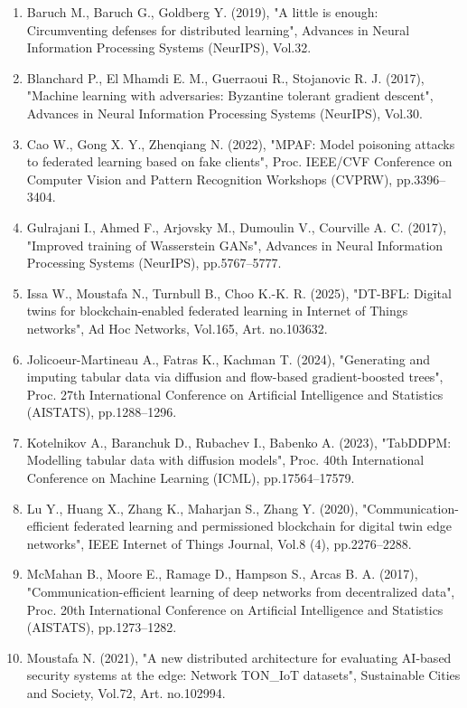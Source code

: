 \begin{enumerate}
\def\labelenumi{\arabic{enumi}.}
\item
  Baruch M., Baruch G., Goldberg Y. (2019), "A little is enough: Circumventing defenses for distributed learning", Advances in Neural Information Processing Systems (NeurIPS), Vol.32.
\item
  Blanchard P., El Mhamdi E. M., Guerraoui R., Stojanovic R. J. (2017), "Machine learning with adversaries: Byzantine tolerant gradient descent", Advances in Neural Information Processing Systems (NeurIPS), Vol.30.
\item
  Cao W., Gong X. Y., Zhenqiang N. (2022), "MPAF: Model poisoning attacks to federated learning based on fake clients", Proc. IEEE/CVF Conference on Computer Vision and Pattern Recognition Workshops (CVPRW), pp.3396--3404.
\item
  Gulrajani I., Ahmed F., Arjovsky M., Dumoulin V., Courville A. C. (2017), "Improved training of Wasserstein GANs", Advances in Neural Information Processing Systems (NeurIPS), pp.5767--5777.
\item
  Issa W., Moustafa N., Turnbull B., Choo K.-K. R. (2025), "DT-BFL: Digital twins for blockchain-enabled federated learning in Internet of Things networks", Ad Hoc Networks, Vol.165, Art. no.103632.
\item
  Jolicoeur-Martineau A., Fatras K., Kachman T. (2024), "Generating and imputing tabular data via diffusion and flow-based gradient-boosted trees", Proc. 27th International Conference on Artificial Intelligence and Statistics (AISTATS), pp.1288--1296.
\item
  Kotelnikov A., Baranchuk D., Rubachev I., Babenko A. (2023), "TabDDPM: Modelling tabular data with diffusion models", Proc. 40th International Conference on Machine Learning (ICML), pp.17564--17579.
\item
  Lu Y., Huang X., Zhang K., Maharjan S., Zhang Y. (2020), "Communication-efficient federated learning and permissioned blockchain for digital twin edge networks", IEEE Internet of Things Journal, Vol.8 (4), pp.2276--2288.
\item
  McMahan B., Moore E., Ramage D., Hampson S., Arcas B. A. (2017), "Communication-efficient learning of deep networks from decentralized data", Proc. 20th International Conference on Artificial Intelligence and Statistics (AISTATS), pp.1273--1282.
\item
  Moustafa N. (2021), "A new distributed architecture for evaluating AI-based security systems at the edge: Network TON\_IoT datasets", Sustainable Cities and Society, Vol.72, Art. no.102994.

\end{enumerate}
